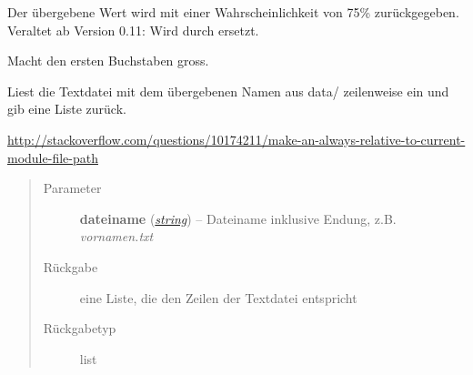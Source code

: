 \documentclass[a4paper,12pt,oneside]{sphinxmanual}
\begin{document}

\begin{fulllineitems}
\label{module:pyzufall.helfer.e75}
Der übergebene Wert wird mit einer Wahrscheinlichkeit von 75\% zurückgegeben.
Veraltet ab Version 0.11: Wird durch {\hyperref[module:pyzufall.helfer.chance]{}} ersetzt.
\end{fulllineitems}


\begin{fulllineitems}
\label{module:pyzufall.helfer.erste_gross}
Macht den ersten Buchstaben gross.

\end{fulllineitems}


\begin{fulllineitems}
\label{module:pyzufall.helfer.lese}
Liest die Textdatei mit dem übergebenen Namen aus data/ zeilenweise ein und gib eine Liste zurück.

\href{http://stackoverflow.com/questions/10174211/make-an-always-relative-to-current-module-file-path}{http://stackoverflow.com/questions/10174211/make-an-always-relative-to-current-module-file-path}
\begin{quote}\begin{description}
\item[{Parameter}] \leavevmode
\textbf{dateiname} (\href{http://docs.python.org/library/string.html\#string}{\emph{string}}) -- Dateiname inklusive Endung, z.B. \emph{vornamen.txt}

\item[{Rückgabe}] \leavevmode
eine Liste, die den Zeilen der Textdatei entspricht

\item[{Rückgabetyp}] \leavevmode
list

\end{description}\end{quote}

\end{fulllineitems}

\end{document}
